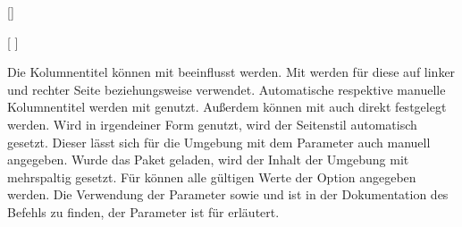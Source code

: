 \begin{Declaration*}{}
\begin{Declaration*}{}
\begin{Declaration*}{}
\begin{Declaration}{[]}
\begin{Declaration}{%
  [%
  ]%
}
\begin{Declaration}{}
\begin{Declaration}{}
\begin{Declaration}{%
}
\begin{Declaration}{%
}
\begin{Declaration}{}
\begin{Declaration}{%
}
\begin{Declaration}{}
\begin{Declaration}{}
\begin{Declaration}{}
Die Kolumnentitel können mit  
beeinflusst werden. Mit  werden 
für diese auf linker und rechter Seite  beziehungsweise
 verwendet. Automatische respektive manuelle Kolumnentitel 
werden mit  genutzt. Außerdem 
können mit  
auch direkt festgelegt werden. Wird  
in irgendeiner Form genutzt, wird der Seitenstil  
automatisch gesetzt. Dieser lässt sich für die Umgebung mit dem Parameter 
 auch manuell angegeben. Wurde das 
Paket  geladen, wird der Inhalt der Umgebung mit 
 mehrspaltig gesetzt. 
Für  können alle gültigen Werte der 
Option  angegeben werden. Die Verwendung der Parameter 
 sowie  
und  ist in der Dokumentation des Befehls 
 zu finden, der Parameter  
ist für  erläutert.
\end{Declaration}
\end{Declaration}
\end{Declaration}
\end{Declaration}
\end{Declaration}
\end{Declaration}
\end{Declaration}
\end{Declaration}
\end{Declaration}
\end{Declaration}
\end{Declaration}


\end{Declaration*}
\end{Declaration*}
\end{Declaration*}
